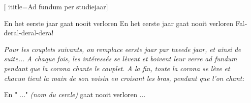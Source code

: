 [
ititle={Ad fundum per studiejaar}]

\beginverse
En het eerste jaar gaat nooit verloren
En het eerste jaar gaat nooit verloren
Fal-deral-deral-dera!
\endverse

\emph{Pour les couplets suivants, on remplace \textit{eerste jaar} par \textit{tweede jaar}, et ainsi de suite... A chaque fois,
	les intéressés se lèvent et boivent leur verre ad fundum pendant que la corona chante le couplet. A la
	fin, toute la corona se lève et chacun tient la main de son voisin en croisant les bras, pendant que l'on
	chant:}
	
\beginverse
En " ..." \emph{(nom du cercle)} gaat nooit verloren ...
\endverse
\endsong